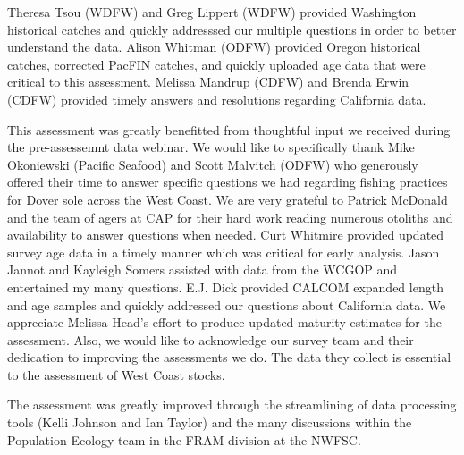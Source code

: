 \documentclass[11pt,
  english,
  a4paper,
]{article}
\begin{document}
\leavevmode\tagmcend\tagstructend\par


Theresa Tsou (WDFW) and Greg Lippert (WDFW) provided Washington historical catches and quickly addresssed our multiple questions in order to better understand the data. Alison Whitman (ODFW) provided Oregon historical catches, corrected PacFIN catches, and quickly uploaded age data that were critical to this assessment. Melissa Mandrup (CDFW) and Brenda Erwin (CDFW) provided timely answers and resolutions regarding California data.

\leavevmode\tagmcend\tagstructend\par


This assessment was greatly benefitted from thoughtful input we received during the pre-assessemnt data webinar. We would like to specifically thank Mike Okoniewski (Pacific Seafood) and Scott Malvitch (ODFW) who generously offered their time to answer specific questions we had regarding fishing practices for Dover sole across the West Coast. We are very grateful to Patrick McDonald and the team of agers at CAP for their hard work reading numerous otoliths and availability to answer questions when needed. Curt Whitmire provided updated survey age data in a timely manner which was critical for early analysis. Jason Jannot and Kayleigh Somers assisted with data from the WCGOP and entertained my many questions. E.J. Dick provided CALCOM expanded length and age samples and quickly addressed our questions about California data. We appreciate Melissa Head's effort to produce updated maturity estimates for the assessment. Also, we would like to acknowledge our survey team and their dedication to improving the assessments we do. The data they collect is essential to the assessment of West Coast stocks.

\leavevmode\tagmcend\tagstructend\par


The assessment was greatly improved through the streamlining of data processing tools (Kelli Johnson and Ian Taylor) and the many discussions within the Population Ecology team in the FRAM division at the NWFSC.

\leavevmode\tagmcend\tagstructend\par
\end{document}
